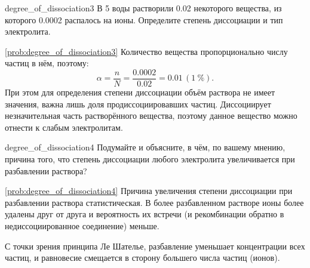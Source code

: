 \begin{problem}{}{degree_of_dissociation3}
    В \qty{5}{\ruL} воды растворили \qty{0,02}{\ruMole} некоторого вещества, из которого \qty{0,0002}{\ruMole} распалось на ионы. Определите степень диссоциации и тип электролита.
    \begin{sol}{\ref{prob:degree_of_dissociation3}}
        Количество вещества пропорционально числу частиц в нём, поэтому:
        \begin{equation*}
            \alpha = \frac{n}{N} = \frac{\num{0,0002}}{\num{0,02}} = \num{0,01} \, (\qty{1}{\percent}).
        \end{equation*}
        При этом для определения степени диссоциации объём раствора не имеет значения, важна лишь доля продиссоциировавших частиц. Диссоциирует незначительная часть растворённого вещества, поэтому данное вещество можно отнести к слабым электролитам.
    \end{sol}
\end{problem}

\begin{problem}{}{degree_of_dissociation4}
    Подумайте и объясните, в чём, по вашему мнению, причина того, что степень диссоциации любого электролита увеличивается при разбавлении раствора?
    \begin{sol}{\ref{prob:degree_of_dissociation4}}
        Причина увеличения степени диссоциации при разбавлении раствора статистическая. В более разбавленном растворе ионы более удалены друг от друга и вероятность их встречи (и рекомбинации обратно в недиссоциированное соединение) меньше.

        С точки зрения принципа Ле Шателье, разбавление уменьшает концентрации всех частиц, и равновесие смещается в сторону большего числа частиц (ионов).
    \end{sol}
\end{problem}


